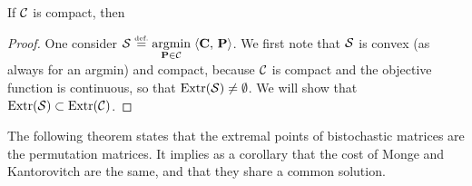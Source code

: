 \begin{prop}\label{prop-extr-optim}
	If $\mathcal{C}$ is compact, then 
\end{prop}
\begin{proof}
	One consider $\mathcal{S} \stackrel{\mbox{\upshape\tiny def.}}{=} \underset{\mathrm{\textbf{\upshape P}} \in \mathcal{C}}{\operatorname{argmin}}\; \langle \mathrm{\textbf{\upshape C}},\,\mathrm{\textbf{\upshape P}}\rangle$. 
	We first note that $\mathcal{S}$ is convex (as always for an argmin) and compact, because $\mathcal{C}$ is compact and the objective function is continuous, so that $\text{Extr}(\mathcal{S}) \neq \emptyset$.
	We will show that $\text{Extr}(\mathcal{S}) \subset \text{Extr}(\mathcal{C})$. 
\end{proof}

The following theorem states that the extremal points of bistochastic matrices are the permutation matrices. It implies as a corollary that the cost of Monge and Kantorovitch are the same, and that they share a common solution. 


